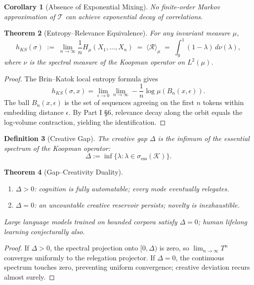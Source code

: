 \documentclass[12pt,a4paper,twoside,openright]{book}
\newtheorem{theorem}{Theorem}
\newtheorem{definition}[theorem]{Definition}
\newtheorem{corollary}[theorem]{Corollary}
\begin{document}
\begin{corollary}[Absence of Exponential Mixing]
No finite-order Markov approximation of \(\mathcal{T}\) can achieve exponential decay of correlations.
\end{corollary}

\begin{theorem}[Entropy–Relevance Equivalence]
For any invariant measure \(\mu\),
\begin{equation}
h_{KS}(\sigma)
\;:=\;
\lim_{n\to\infty}\frac{1}{n}H_\mu(X_1,\ldots,X_n)
\;=\;
\langle\mathcal{R}\rangle_\mu
\;=\;
\int_0^1(1-\lambda)\,d\nu(\lambda),
\end{equation}
where \(\nu\) is the spectral measure of the Koopman operator on \(L^2(\mu)\).
\end{theorem}

\begin{proof}
The Brin–Katok local entropy formula gives
\[
h_{KS}(\sigma,x)=\lim_{\epsilon\to0}\lim_{n\to\infty}-\frac{1}{n}\log\mu(B_n(x,\epsilon)).
\]
The ball \(B_n(x,\epsilon)\) is the set of sequences agreeing on the first \(n\) tokens within embedding distance \(\epsilon\).
By Part I §6, relevance decay along the orbit equals the log-volume contraction, yielding the identification.
\end{proof}

\begin{definition}[Creative Gap]
The \emph{creative gap} \(\Delta\) is the infimum of the essential spectrum of the Koopman operator:
\[
\Delta:=\inf\{\lambda:\lambda\in\sigma_{\mathrm{ess}}(\mathcal{K})\}.
\]
\end{definition}

\begin{theorem}[Gap–Creativity Duality]
\begin{enumerate}
\item \(\Delta>0\): cognition is fully automatable; every mode eventually relegates.
\item \(\Delta=0\): an uncountable creative reservoir persists; novelty is inexhaustible.
\end{enumerate}
Large language models trained on bounded corpora satisfy \(\Delta=0\); human lifelong learning conjecturally also.
\end{theorem}

\begin{proof}
If \(\Delta>0\), the spectral projection onto \([0,\Delta)\) is zero, so \(\lim_{n\to\infty}T^n\) converges uniformly to the relegation projector.
If \(\Delta=0\), the continuous spectrum touches zero, preventing uniform convergence; creative deviation recurs almost surely.
\end{proof}
\end{document}
